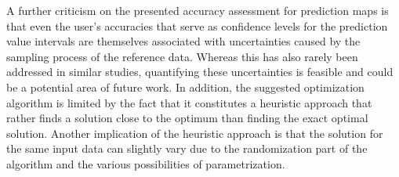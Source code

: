 A further criticism on the presented accuracy assessment for prediction maps is that even the user's accuracies that serve as confidence levels for the prediction value intervals are themselves associated with uncertainties caused by the sampling process of the reference data. Whereas this has also rarely been addressed in similar studies, quantifying these uncertainties is feasible and could be a potential area of future work. In addition, the suggested optimization algorithm is limited by the fact that it constitutes a heuristic approach that rather finds a solution close to the optimum than finding the exact optimal solution. Another implication of the heuristic approach is that the solution for the same input data can slightly vary due to the randomization part of the algorithm and the various possibilities of parametrization.


